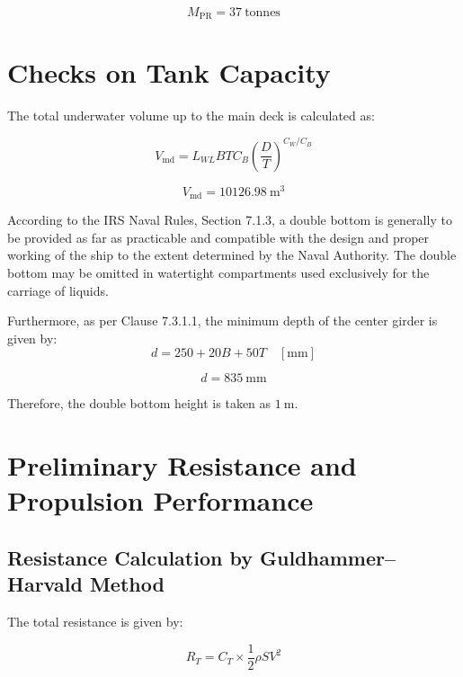 \documentclass[12pt,a4paper,twoside]{report}
\begin{document}
\[
M_{\mathrm{PR}} = 37~\text{tonnes}
\]


\section{Checks on Tank Capacity}

The total underwater volume up to the main deck is calculated as:

\begin{equation}
V_{\mathrm{md}}
=
L_{WL} B T C_B
\left(\frac{D}{T}\right)^{C_W/C_B}
\end{equation}

\[
V_{\mathrm{md}} = 10126.98~\mathrm{m^3}
\]

\vspace{\baselineskip}\par\noindent According to the IRS Naval Rules, Section 7.1.3, a double bottom
is generally to be provided as far as practicable and compatible with
the design and proper working of the ship to the extent determined by
the Naval Authority. The double bottom may be omitted in watertight
compartments used exclusively for the carriage of liquids.

\vspace{\baselineskip} \par \noindent Furthermore, as per Clause 7.3.1.1, the minimum depth of the center girder is 
given by:
\begin{equation}
d = 250 + 20B + 50T \quad [\mathrm{mm}]
\end{equation}

\[
d = 835~\mathrm{mm}
\]

\vspace{\baselineskip} \par \noindent Therefore, the double bottom height is taken as $1~\mathrm{m}$.

\section{Preliminary Resistance and Propulsion Performance}

\subsection{Resistance Calculation by Guldhammer--Harvald Method}

The total resistance is given by:

\begin{equation}
R_T = C_T \times \frac{1}{2}\rho S V^2
\label{eq : 2.14}
\end{equation}
\end{document}
